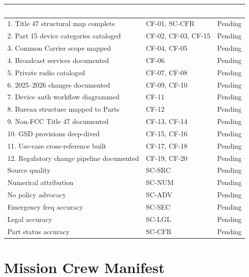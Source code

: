 \documentclass[11pt,letterpaper]{article}
\newcommand{\tableheader}[1]{\textbf{\sffamily\textcolor{white}{#1}}}
\begin{document}
\begin{center}
\begin{tabularx}{\textwidth}{XL{4cm}C{1.5cm}}
\toprule
{}
\tableheader{Success Criterion} & \tableheader{Test ID(s)} & \tableheader{Status} \\
. Title 47 structural map complete & CF-01, SC-CFR & Pending \\
2. Part 15 device categories cataloged & CF-02, CF-03, CF-15 & Pending \\
3. Common Carrier scope mapped & CF-04, CF-05 & Pending \\
4. Broadcast services documented & CF-06 & Pending \\
5. Private radio cataloged & CF-07, CF-08 & Pending \\
6. 2025--2026 changes documented & CF-09, CF-10 & Pending \\
7. Device auth workflow diagrammed & CF-11 & Pending \\
8. Bureau structure mapped to Parts & CF-12 & Pending \\
9. Non-FCC Title 47 documented & CF-13, CF-14 & Pending \\
10. GSD provisions deep-dived & CF-15, CF-16 & Pending \\
11. Use-case cross-reference built & CF-17, CF-18 & Pending \\
12. Regulatory change pipeline documented & CF-19, CF-20 & Pending \\
\midrule
Source quality & SC-SRC & Pending \\
Numerical attribution & SC-NUM & Pending \\
No policy advocacy & SC-ADV & Pending \\
Emergency freq accuracy & SC-SEC & Pending \\
Legal accuracy & SC-LGL & Pending \\
Part status accuracy & SC-CFR & Pending \\
\bottomrule
\end{tabularx}
\end{center}

\section{Mission Crew Manifest}
\end{document}
